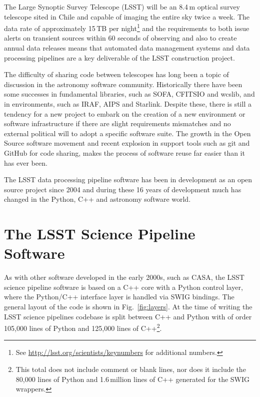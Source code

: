 \documentclass[]{spie}  %
\begin{document}
The Large Synoptic Survey Telescope (LSST)\cite{2008arXiv0805.2366I,2016SPIE-Kahn} will be an 8.4\,m optical survey telescope sited in Chile\cite{2014SPIE.9145E..1AG} and capable of imaging the entire sky twice a week.
The data rate of approximately 15\,TB per night\footnote{See \url{http://lsst.org/scientists/keynumbers} for additional numbers.} and the requirements to both issue alerts on transient sources within 60 seconds of observing and also to create annual data releases means that automated data management systems and data processing pipelines are a key deliverable of the LSST construction project\cite{2016_adassxxv_O3-1}.

The difficulty of sharing code between telescopes has long been a topic of discussion in the astronomy software community\cite{1998ASPC..145..142M,1999ASPC..172...11E,2001ASSL..266..163S,2002SPIE.4844..321E}.
Historically there have been some successes in fundamental libraries, such as SOFA\cite{2011SchpJ...611404H}, CFITSIO\cite{1999ASPC..172..487P} and wcslib\cite{2011ascl.soft08003C}, and in environments, such as IRAF\cite{1986SPIE..627..733T}, AIPS\cite{1996ASPC..101...37V} and Starlink\cite{1982QJRAS..23..485D}.
Despite these, there is still a tendency for a new project to embark on the creation of a new environment or software infrastructure if there are slight requirements mismatches and no external political will to adopt a specific software suite.
The growth in the Open Source software movement\cite{2006OpenSources} and recent explosion in support tools such as git and GitHub for code sharing\cite{2014IACWSLima}, makes the process of software reuse far easier than it has ever been.

The LSST data processing pipeline software has been in development as an open source project since 2004\cite{2004AAS...20510811A,2010SPIE.7740E..15A,2016_adassxxv_P056} and during these 16 years of development much has changed in the Python, C++ and astronomy software world.


\section{The LSST Science Pipeline Software}

As with other software developed in the early 2000s, such as CASA\cite{2012ASPC..461..849P}, the LSST science pipeline software is based on a C++ core with a Python control layer, where the Python/C++ interface layer is handled via SWIG\cite{beazley2003automated} bindings.
The general layout of the code is shown in Fig.~\ref{fig:layers}.
At the time of writing the LSST science pipelines codebase is split between C++ and Python with of order 105,000 lines of Python and 125,000 lines of C++\footnote{This total does not include comment or blank lines, nor does it include the 80,000 lines of Python and 1.6\,million lines of C++ generated for the SWIG wrappers.}.
\end{document}
